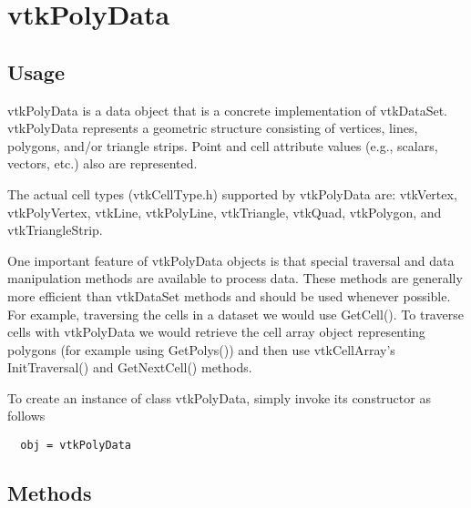 \section{vtkPolyData}

\subsection{Usage}

 vtkPolyData is a data object that is a concrete implementation of
 vtkDataSet. vtkPolyData represents a geometric structure consisting of
 vertices, lines, polygons, and/or triangle strips. Point and cell
 attribute values (e.g., scalars, vectors, etc.) also are represented.

 The actual cell types (vtkCellType.h) supported by vtkPolyData are: 
 vtkVertex, vtkPolyVertex, vtkLine, vtkPolyLine, vtkTriangle, vtkQuad,
 vtkPolygon, and vtkTriangleStrip.

 One important feature of vtkPolyData objects is that special traversal and
 data manipulation methods are available to process data. These methods are
 generally more efficient than vtkDataSet methods and should be used
 whenever possible. For example, traversing the cells in a dataset we would
 use GetCell(). To traverse cells with vtkPolyData we would retrieve the
 cell array object representing polygons (for example using GetPolys()) and
 then use vtkCellArray's InitTraversal() and GetNextCell() methods.


To create an instance of class vtkPolyData, simply
invoke its constructor as follows
\begin{verbatim}
  obj = vtkPolyData
\end{verbatim}
\subsection{Methods}

